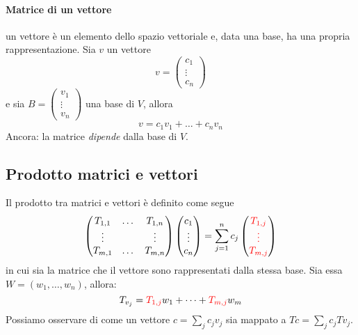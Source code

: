 \documentclass{article}
\begin{document}
            \paragraph{Matrice di un vettore} un vettore è un elemento dello spazio vettoriale e, data una base, ha una propria 
            rappresentazione. Sia $v$ un vettore
                \[v = \begin{pmatrix}
                    c_1 \\
                    \vdots \\
                    c_n
                    \end{pmatrix}\]
            e sia $B = \begin{pmatrix}
                v_1 \\
                \vdots \\
                v_n
                \end{pmatrix}$ una base di $V$, allora
                \[v=c_1v_1 +\dots + c_nv_n\]
            Ancora: la matrice \emph{dipende} dalla base di $V$.
        \subsection{Prodotto matrici e vettori}
            Il prodotto tra matrici e vettori è definito come segue
                \[
                    \begin{pmatrix}
                        T_{1,1} & \dots & T_{1,n}\\
                        \vdots & & \vdots \\
                        T_{m,1} & \dots & T_{m,n}
                    \end{pmatrix} 
                    \begin{pmatrix}
                        c_1 \\
                        \vdots \\
                        c_n
                    \end{pmatrix} = \sum_{j=1}^n c_j 
                    \begin{pmatrix} \color{red}
                        T_{1,j} \\
                        \color{red} \vdots \\
                        \color{red} T_{m,j}
                    \end{pmatrix}
                \]
            in cui sia la matrice che il vettore sono rappresentati dalla stessa base. Sia essa $W = (w_1, \dots, w_n)$, allora:
            \[T_{v_j} = \textcolor{red}{T_{1,j}}w_1 + \dots + \textcolor{red}{T_{m,j}}w_m\]
            Possiamo osservare di come un vettore $c = \sum_j c_jv_j$ sia mappato a $Tc = \sum_j c_jTv_j$.
\end{document}
